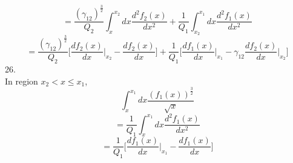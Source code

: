 \documentclass[fleqn, 10pt]{article}
\begin{document}
           \begin{equation*}
               = \frac{(\gamma_{12})^\frac{3}{2}}{Q_2} \int^{x_2}_{x} dx \frac{d^2f_2(x)}{dx^2} + \frac{1}{Q_1} \int^{x_1}_{x_2} dx \frac{d^2f_1(x)}{dx^2}
           \end{equation*}
           \begin{equation}
               =   \frac{(\gamma_{12})^\frac{3}{2}}{Q_2} \biggl[ \frac{df_2(x)}{dx} \Bigg|_{x_2} - \frac{df_2(x)}{dx} \biggr] +   \frac{1}{Q_1} \biggl[ \frac{df_1(x)}{dx} \Bigg|_{x_1} -  \gamma_{12} \frac{df_2(x)}{dx} \Bigg|_{x_2} \biggr]
               \label{110}
           \end{equation}
           26. \\ 
           In region $x_2<x\leq x_1$,
           \begin{equation*}
               \int^{x_1}_{x} dx \frac{(f_1(x))^\frac{3}{2}}{\sqrt{x}}
           \end{equation*}
           \begin{equation*}
               = \frac{1}{Q_1} \int^{x_1}_{x} dx \frac{d^2f_1(x)}{dx^2}
           \end{equation*}
           \begin{equation}
               =  \frac{1}{Q_1} \biggl[ \frac{df_1(x)}{dx} \Bigg|_{x_1} - \frac{df_1(x)}{dx} \biggr]
               \label{111}
           \end{equation}
\end{document}
